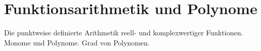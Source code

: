 \section{Funktionsarithmetik und Polynome}
 
Die punktweise definierte Arithmetik reell- und komplexwertiger Funktionen. Monome und Polynome. Grad von Polynomen. 